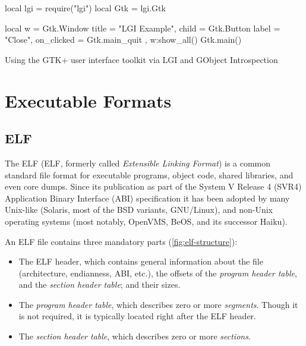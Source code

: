 \begin{listing}[H]
	\begin{luacode}
	local lgi = require("lgi")
	local Gtk = lgi.Gtk

	local w = Gtk.Window {
		title = "LGI Example",
		child = Gtk.Button { label = "Close",
                         on_clicked = Gtk.main_quit },
	}
	w:show_all()
	Gtk.main()
	\end{luacode}
	\caption{Using the GTK+ user interface toolkit via LGI and GObject
	Introspection}
	\label{lst:lua-lgi-example}
\end{listing}

\section{Executable Formats}

\subsection{ELF}
  \label{sec:elf}

The \acrlong{ELF} (ELF, formerly called \emph{Extensible Linking
Format}) is a common standard file format for executable programs, object
code, shared libraries, and even core dumps. Since its publication as part of
the System V Release 4 (SVR4) Application Binary Interface (ABI) specification
\cite[c.~4]{elfspec-sysv}
it has been adopted by many Unix-like (Solaris, most of the BSD variants,
GNU/Linux), and non-Unix operating systems (most notably, OpenVMS, BeOS, and
its successor Haiku).

\noindent An ELF file contains three mandatory parts
(\autoref{fig:elf-structure}):

\begin{itemize}

	\item The ELF header, which contains general information about the file
	(architecture, endianness, ABI, etc.), the offsets of the \emph{program
	header table}, and the \emph{section header table}; and their sizes.

	\item The \emph{program header table}, which describes zero or more
	\emph{segments}. Though it is not required, it is typically located right
	after the ELF header.

	\item The \emph{section header table}, which describes zero or more
	\emph{sections}.

\end{itemize}


